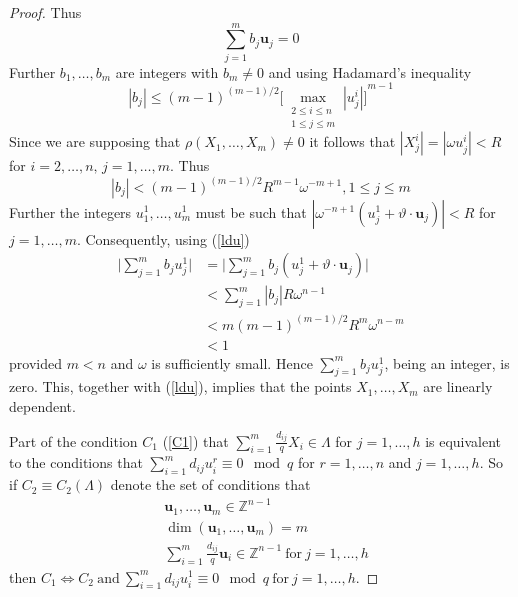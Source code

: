 \documentclass[11pt]{article}
\theoremstyle{definition}
\theoremstyle{proof}
\begin{document}
\begin{proof}
    Thus
    \begin{equation}\label{ldu}
        \sum_{j=1}^{m} b_j \bm{u}_j = 0
    \end{equation}
    Further $b_1, \ldots, b_m$ are integers with $b_m \neq 0$ and using Hadamard's inequality
    \[
        |b_j| \leq {(m-1)}^{(m-1)/2} {\Big[\max_{\substack{2 \leq i\leq n \\ 1 \leq  j \leq m}}|u^i_j|\Big]}^{m-1}
    \]
    Since we are supposing that $\rho (X_1, \ldots, X_m) \neq 0$ it follows that $|X^i_j| = |\omega u^i_j| < R$ for $i = 2, \ldots, n, \, j = 1, \ldots, m$.
    Thus
    \[
        |b_j| < {(m-1)}^{(m-1)/2} R^{m-1} \omega ^{-m+1}, 1 \leq j \leq m 
    \]
    Further the integers $u^1_1, \ldots, u^1_m$ must be such that $|\omega ^{-n+1} (u^1_j + \vartheta \cdot \bm{u}_j)| < R$ for $j = 1, \ldots, m$.
    Consequently, using (\ref{ldu})
    \begin{align*}
        \bigg|\sum_{j=1}^{m} b_j u^1_j\bigg| &= \bigg|\sum_{j=1}^{m}b_j (u^1_j + \vartheta \cdot \bm{u}_j)\bigg| \\
        &< \sum_{j=1}^{m} |b_j|R \omega ^{n-1} \\
        &< m{(m-1)}^{(m-1)/2} R^m \omega ^{n-m} \\
        &< 1
    \end{align*}
    provided $m<n$ and $\omega$ is sufficiently small.
    Hence $\displaystyle\sum_{j=1}^{m} b_j u^1_j$, being an integer, is zero.
    This, together with (\ref{ldu}), implies that the points $X_1, \ldots, X_m$ are linearly dependent.

    Part of the condition $C_1$ (\ref{C1}) that $\sum\limits_{i=1}^{m} \frac{d_{ij}}{q} X_i \in \Lambda $ for $j = 1, \ldots, h$ is equivalent to the conditions that $\sum\limits_{i=1}^{m}d_{ij}u_i^r \equiv 0 \mod q$ for $r=1, \ldots, n$ and $j=1, \ldots, h$.
    So if $C_2 \equiv C_2(\Lambda )$ denote the set of conditions that
    \begin{equation}\label{C2}
        \begin{split}
            & \bm{u}_1, \ldots, \bm{u}_m \in \mathbb{Z}^{n-1} \\
            & \dim (\bm{u}_1, \ldots, \bm{u}_m) = m \\
            & \displaystyle\sum_{i=1}^{m} \frac{d_{ij}}{q}\bm{u}_i \in \mathbb{Z}^{n-1} \ \text{for} \ j=1, \ldots, h
        \end{split}
    \end{equation}
    then $C_1 \iff C_2 \ \text{and} \ \sum\limits_{i=1}^{m} d_{ij}u_i^1 \equiv 0 \mod q \ \text{for} \ j=1, \ldots, h$.


\end{proof}
\end{document}

